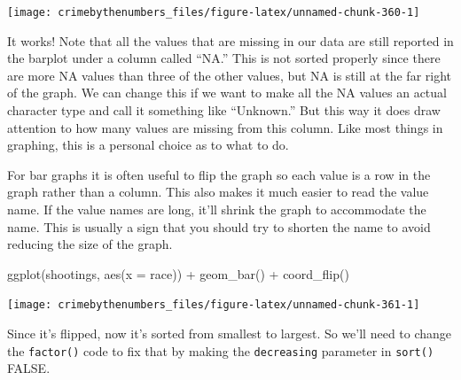 \documentclass[
  a4paper,
]{krantz}
\makeatletter
\newenvironment{Shaded}{\begin{snugshade}}{\end{snugshade}}
\newcommand{\AttributeTok}[1]{\textcolor[rgb]{0.61,0.61,0.61}{#1}}
\newcommand{\ConstantTok}[1]{\textcolor[rgb]{0,0,0}{#1}}
\newcommand{\FunctionTok}[1]{\textcolor[rgb]{0,0,0}{#1}}
\newcommand{\NormalTok}[1]{#1}
\newcommand{\OtherTok}[1]{\textcolor[rgb]{0.37,0.37,0.37}{#1}}
\newcommand{\SpecialCharTok}[1]{\textcolor[rgb]{0,0,0}{#1}}
\newenvironment{kframe}{%
\medskip{}
\setlength{\fboxsep}{.8em}
 \def\at@end@of@kframe{}%
 \ifinner\ifhmode%
  \def\at@end@of@kframe{\end{minipage}}%
  \begin{minipage}{\columnwidth}%
 \fi\fi%
 \def\FrameCommand##1{\hskip\@totalleftmargin \hskip-\fboxsep
 \colorbox{shadecolor}{##1}\hskip-\fboxsep
     \hskip-\linewidth \hskip-\@totalleftmargin \hskip\columnwidth}%
 \MakeFramed {\advance\hsize-\width
   \@totalleftmargin\z@ \linewidth\hsize
   \@setminipage}}%
 {\par\unskip\endMakeFramed%
 \at@end@of@kframe}
\renewenvironment{Shaded}{\begin{kframe}}{\end{kframe}}
\makeatother
\begin{document}
\begin{center}\texttt{[image: crimebythenumbers\_files/figure-latex/unnamed-chunk-360-1]} \end{center}

It works! Note that all the values that are missing in our
data are still reported in the barplot under a column called
``NA.'' This is not sorted properly since there are more NA
values than three of the other values, but NA is still at
the far right of the graph. We can change this if we want to
make all the NA values an actual character type and call it
something like ``Unknown.'' But this way it does draw
attention to how many values are missing from this column.
Like most things in graphing, this is a personal choice as
to what to do.

For bar graphs it is often useful to flip the graph so each
value is a row in the graph rather than a column. This also
makes it much easier to read the value name. If the value
names are long, it'll shrink the graph to accommodate the
name. This is usually a sign that you should try to shorten
the name to avoid reducing the size of the graph.

\begin{Shaded}
\begin{Highlighting}[]
\FunctionTok{ggplot}\NormalTok{(shootings, }\FunctionTok{aes}\NormalTok{(}\AttributeTok{x =}\NormalTok{ race)) }\SpecialCharTok{+}
  \FunctionTok{geom\_bar}\NormalTok{() }\SpecialCharTok{+}
  \FunctionTok{coord\_flip}\NormalTok{()}
\end{Highlighting}
\end{Shaded}

\begin{center}\texttt{[image: crimebythenumbers\_files/figure-latex/unnamed-chunk-361-1]} \end{center}

Since it's flipped, now it's sorted from smallest to
largest. So we'll need to change the \texttt{factor()} code
to fix that by making the \texttt{decreasing} parameter in
\texttt{sort()} FALSE.

\begin{Shaded}
\end{Shaded}
\end{document}
